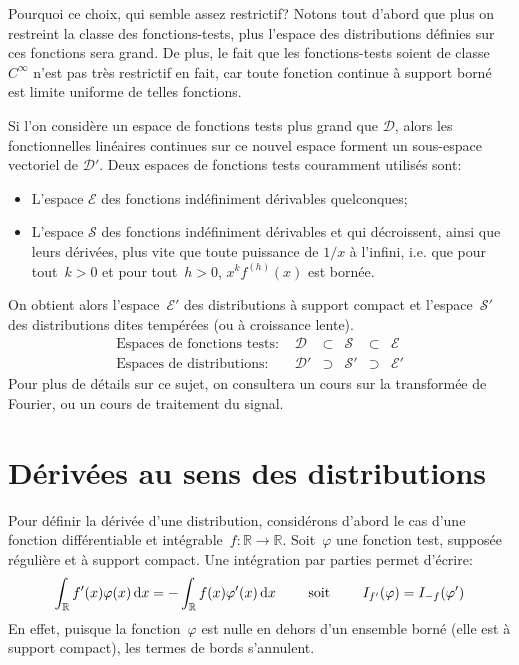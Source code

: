\medskip
\begin{remarque}
Pourquoi ce choix, qui semble assez restrictif?
Notons tout d'abord que plus on restreint la classe des fonctions-tests, plus l'espace des distributions définies sur ces fonctions sera grand. De plus, le fait que les fonctions-tests soient de classe~$C^\infty$ n'est pas très restrictif en fait, car toute fonction continue à support borné est limite uniforme de telles fonctions. 

Si l'on considère un espace de fonctions tests plus grand que $\mathcal{D}$, alors les fonctionnelles linéaires continues sur ce nouvel espace forment un sous-espace vectoriel de $\mathcal{D}'$. Deux espaces de fonctions tests couramment utilisés sont:
\begin{itemize}
   \item L'espace $\mathcal{E}$ des fonctions indéfiniment dérivables quelconques;
   \item L'espace $\mathcal{S}$ des fonctions indéfiniment dérivables et qui décroissent, ainsi que leurs dérivées, plus vite que toute puissance de $1/x$ à l'infini, i.e. que pour tout~$k>0$ et pour tout~$h>0$, $x^kf^{(h)}(x)$ est bornée.
\end{itemize}
On obtient alors l'espace~$\mathcal{E}'$ des distributions à support compact et l'espace~$\mathcal{S}'$ des distributions dites tempérées (ou à croissance lente).
\[ \begin{array}{llllll}
\text{Espaces de fonctions tests: } & \mathcal{D} &\subset &\mathcal{S} &\subset &\mathcal{E} \\
\text{Espaces de distributions: } &  \mathcal{D}' &\supset &\mathcal{S}' &\supset &\mathcal{E}'
\end{array} \]
Pour plus de détails sur ce sujet, on consultera un cours sur la transformée de Fourier, ou un cours de traitement du signal.
\end{remarque}

\medskip
\section{Dérivées au sens des distributions}
Pour définir la dérivée d'une distribution, considérons d'abord le cas d'une fonction différentiable et intégrable~$f:\mathbb{R}\rightarrow\mathbb{R}$.
Soit~$\varphi$ une fonction test, supposée régulière et à support compact.
Une intégration par parties permet d'écrire:
\begin{equation}
  \int_{\mathbb R} f'(x) \varphi(x)\,\text{d} x = -\int_{\mathbb R} f(x)\varphi'(x)\,\text{d} x \qquad\text{ soit }\qquad I_{f'}(\varphi)=I_{-f}(\varphi')
\end{equation}
En effet, puisque la fonction~$\varphi$ est nulle en dehors d'un ensemble borné (elle est à support compact), les termes de bords s'annulent.

